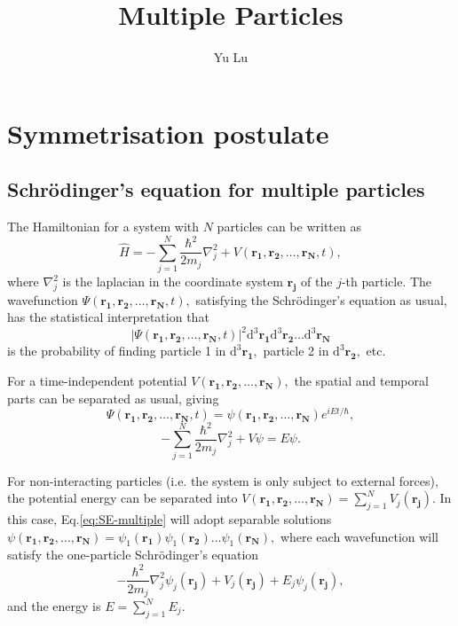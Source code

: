 \documentclass{article}
\title{Multiple Particles}
\author{Yu Lu}
\theoremstyle{nonumberplain}
\begin{document}
\maketitle
\section{Symmetrisation postulate}
\subsection{Schrödinger's equation for multiple particles} \label{sec:multiple_particle}
The Hamiltonian for a system with $N$ particles can be written as 
\[
    \hat{H} = - \sum\limits_{j=1}^{N} \frac{\hbar ^{2} }{2 m_j} \nabla^{2}_j + V(\mathbf{r_1}, \mathbf{r_2}, \ldots , \mathbf{r_N},  t ),
\]
where $\nabla^{2}_j$ is the laplacian in the coordinate system $\mathbf{r_j}$ of the $j$-th particle. The wavefunction $\Psi (\mathbf{r_1}, \mathbf{r_2}, \ldots , \mathbf{r_N}, t),$ satisfying the Schrödinger's equation as usual, has the statistical interpretation that 
\[
    \left\vert \Psi (\mathbf{r_1}, \mathbf{r_2}, \ldots , \mathbf{r_N}, t) \right\vert ^{2} \mathrm{d} ^3 \mathbf{r_1} \mathrm{d} ^3 \mathbf{r_2} \ldots \mathrm{d} ^3 \mathbf{r_N}  
\]
is the probability of finding particle 1 in $\mathrm{d} ^3 \mathbf{r_1} ,$ particle 2 in $ \mathrm{d} ^3 \mathbf{r_2},$ etc. 

For a time-independent potential $V(\mathbf{r_1}, \mathbf{r_2}, \ldots , \mathbf{r_N} ),$ the spatial and temporal parts can be separated as usual, giving 
\[
    \Psi (\mathbf{r_1}, \mathbf{r_2}, \ldots , \mathbf{r_N} , t)
    = \psi (\mathbf{r_1}, \mathbf{r_2}, \ldots , \mathbf{r_N}) e^{i E t/\hbar },
\] 
\begin{equation}
    \label{eq:SE-multiple}
    -\sum\limits_{j=1}^{N} \frac{\hbar ^{2} }{2 m_j} \nabla ^{2} _j + V \psi = E \psi.
\end{equation} 

For non-interacting particles (i.e. the system is only subject to external forces), the potential energy can be separated into $V(\mathbf{r_1}, \mathbf{r_2}, \ldots , \mathbf{r_N} ) = \sum_{j=1}^{N} V_j(\mathbf{r_j} ). $ In this case, Eq.\eqref{eq:SE-multiple} will adopt separable solutions $\psi(\mathbf{r_1}, \mathbf{r_2}, \ldots , \mathbf{r_N}) = \psi_1(\mathbf{r_1}) \psi_1(\mathbf{r_2}) \ldots \psi_1(\mathbf{r_N}),$ where each wavefunction will satisfy the one-particle Schrödinger's equation 
\[
    -\frac{\hbar ^{2} }{2 m_j} \nabla ^{2} _j \psi_j (\mathbf{r_j}) + V_j(\mathbf{r_j} ) + E_j \psi_j(\mathbf{r_j} ),
\]
and the energy is $E = \sum_{j=1}^{N} E_j.$ 
\end{document}

